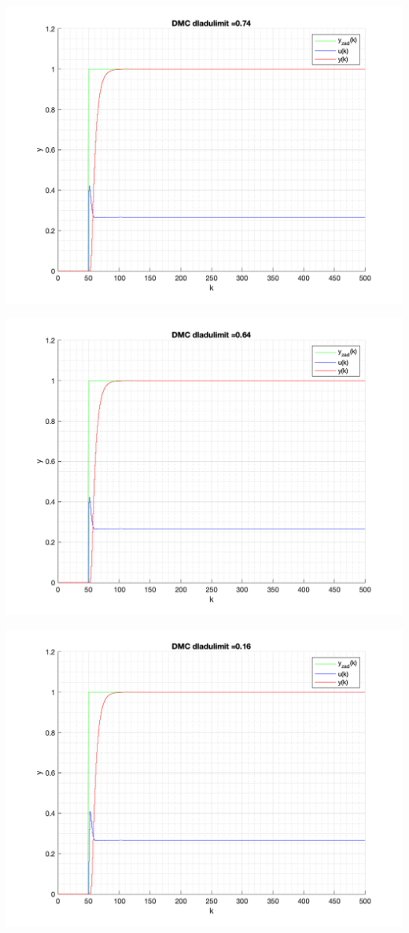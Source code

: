\documentclass[a4paper, 11pt]{article}
\begin{document}
\begin{enumerate}
 \includegraphics[width=\linewidth]{./ModelsP6_dulimit/P4_DMC_dulimit_0_74_png.png} 
 
 \includegraphics[width=\linewidth]{./ModelsP6_dulimit/P4_DMC_dulimit_0_64_png.png} 
 
 \includegraphics[width=\linewidth]{./ModelsP6_dulimit/P4_DMC_dulimit_0_16_png.png} 
 

\end{enumerate}
\end{document}
